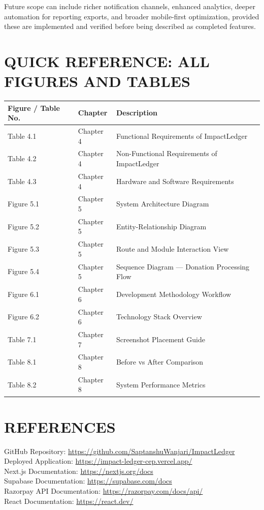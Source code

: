 \documentclass[12pt,a4paper]{article}
\begin{document}
Future scope can include richer notification channels, enhanced analytics, deeper automation for reporting exports, and broader mobile-first optimization, provided these are implemented and verified before being described as completed features.

\section{QUICK REFERENCE: ALL FIGURES AND TABLES}
\begin{longtable}{p{}p{}p{}}
	\toprule
	Figure / Table No. & Chapter   & Description                                   \\
	\midrule
	Table 4.1          & Chapter 4 & Functional Requirements of ImpactLedger       \\
	Table 4.2          & Chapter 4 & Non-Functional Requirements of ImpactLedger   \\
	Table 4.3          & Chapter 4 & Hardware and Software Requirements            \\
	Figure 5.1         & Chapter 5 & System Architecture Diagram                   \\
	Figure 5.2         & Chapter 5 & Entity-Relationship Diagram                   \\
	Figure 5.3         & Chapter 5 & Route and Module Interaction View             \\
	Figure 5.4         & Chapter 5 & Sequence Diagram --- Donation Processing Flow \\
	Figure 6.1         & Chapter 6 & Development Methodology Workflow              \\
	Figure 6.2         & Chapter 6 & Technology Stack Overview                     \\
	Table 7.1          & Chapter 7 & Screenshot Placement Guide                    \\
	Table 8.1          & Chapter 8 & Before vs After Comparison                    \\
	Table 8.2          & Chapter 8 & System Performance Metrics                    \\
	\bottomrule
\end{longtable}

\section{REFERENCES}
GitHub Repository: \url{https://github.com/SaptanshuWanjari/ImpactLedger}\\
Deployed Application: \url{https://impact-ledger-cep.vercel.app/}\\
Next.js Documentation: \url{https://nextjs.org/docs}\\
Supabase Documentation: \url{https://supabase.com/docs}\\
Razorpay API Documentation: \url{https://razorpay.com/docs/api/}\\
React Documentation: \url{https://react.dev/}
\end{document}
